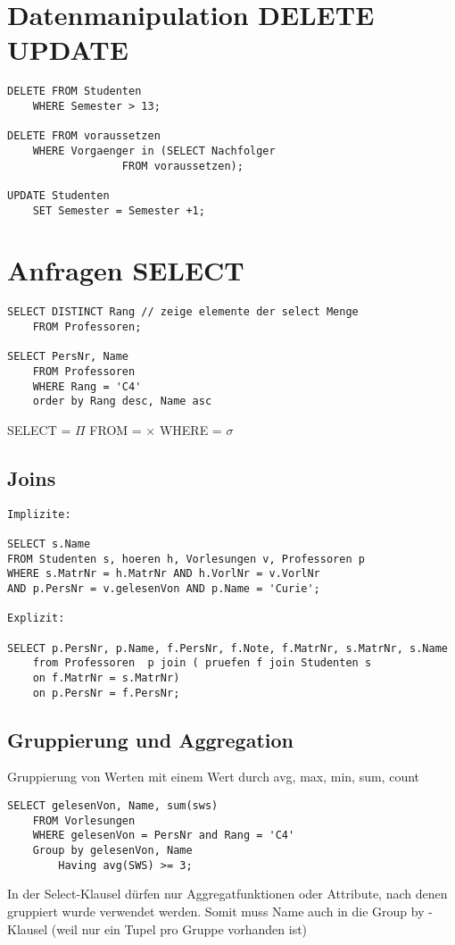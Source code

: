 \section{Datenmanipulation DELETE UPDATE}
\begin{lstlisting}
DELETE FROM Studenten
	WHERE Semester > 13;
	
DELETE FROM voraussetzen
	WHERE Vorgaenger in (SELECT Nachfolger 
			      FROM voraussetzen);

UPDATE Studenten 
	SET Semester = Semester +1;
\end{lstlisting}
\section{Anfragen SELECT}
\begin{lstlisting}
SELECT DISTINCT Rang // zeige elemente der select Menge
	FROM Professoren;

SELECT PersNr, Name
	FROM Professoren
	WHERE Rang = 'C4'
	order by Rang desc, Name asc
\end{lstlisting}
SELECT = $\Pi$ \qquad FROM = $\times$ \qquad WHERE = $\sigma$\\
\newpage
\subsection{Joins}
\begin{lstlisting}
Implizite:

SELECT s.Name
FROM Studenten s, hoeren h, Vorlesungen v, Professoren p
WHERE s.MatrNr = h.MatrNr AND h.VorlNr = v.VorlNr 
AND p.PersNr = v.gelesenVon AND p.Name = 'Curie';

Explizit:

SELECT p.PersNr, p.Name, f.PersNr, f.Note, f.MatrNr, s.MatrNr, s.Name
	from Professoren  p join ( pruefen f join Studenten s 
	on f.MatrNr = s.MatrNr)
	on p.PersNr = f.PersNr;
\end{lstlisting}
\subsection{Gruppierung und Aggregation}
Gruppierung von Werten mit einem Wert durch avg, max, min, sum, count
\begin{lstlisting}
SELECT gelesenVon, Name, sum(sws)
	FROM Vorlesungen
	WHERE gelesenVon = PersNr and Rang = 'C4'
	Group by gelesenVon, Name
		Having avg(SWS) >= 3;
\end{lstlisting}
In der Select-Klausel dürfen nur Aggregatfunktionen oder Attribute, nach denen gruppiert wurde verwendet werden. Somit muss Name auch in die Group by - Klausel (weil nur ein Tupel pro Gruppe vorhanden ist)
